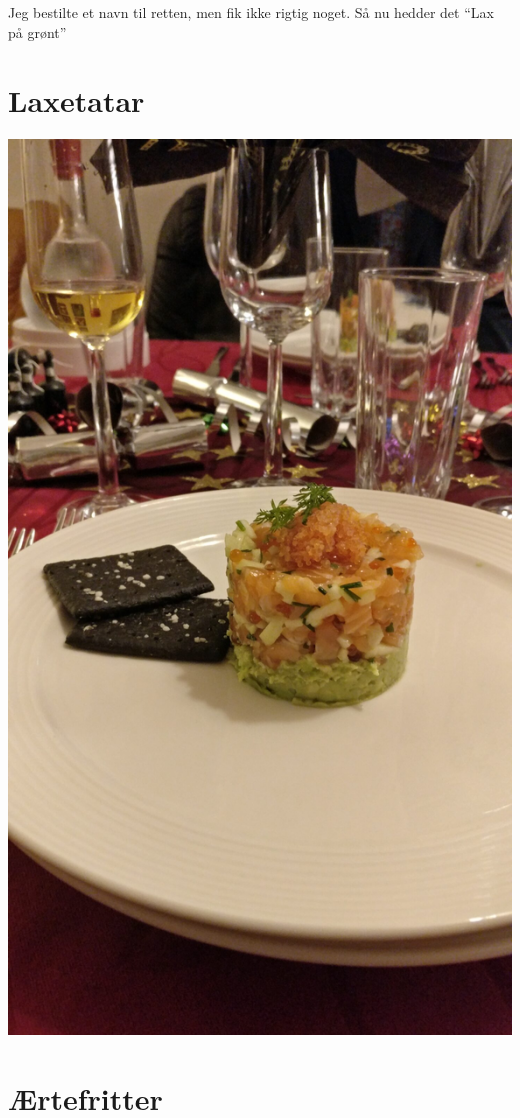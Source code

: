 \documentclass[
]{book}
\begin{document}
Jeg bestilte et navn til retten, men fik ikke rigtig noget. Så nu hedder det ``Lax på grønt''

\hypertarget{laxetatar}{%
\section{Laxetatar}\label{laxetatar}}

\includegraphics{images/forret-scaled.jpg}

\hypertarget{uxe6rtefritter}{%
\section{Ærtefritter}\label{uxe6rtefritter}}
\end{document}
